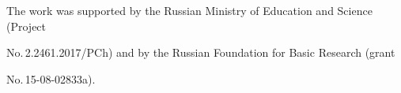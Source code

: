 





\Ack

\noindent

The work was supported by the Russian Ministry of Education and Science (Project 

No.\,2.2461.2017/PCh) and by the Russian Foundation for Basic Research (grant 

No.\,15-08-02833a).



\pagebreak










